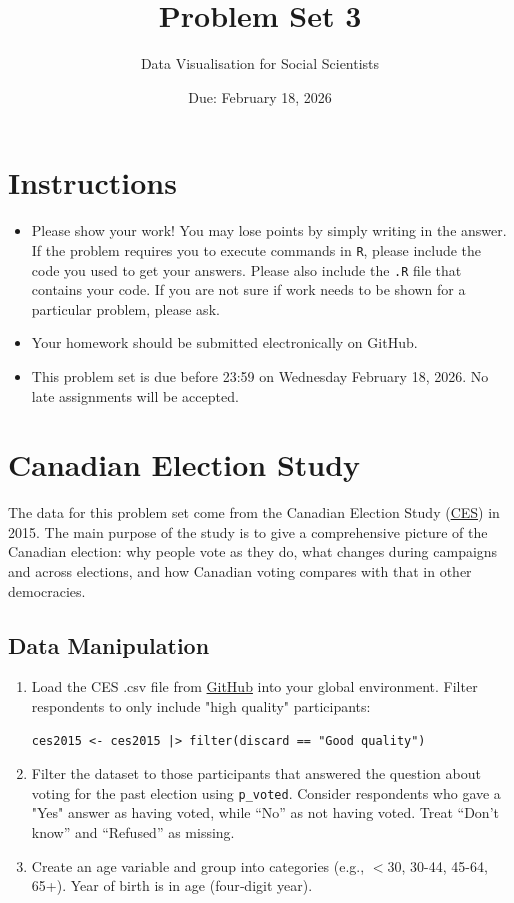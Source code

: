 \documentclass[12pt,letterpaper]{article}
\title{Problem Set 3}
\date{Due: February 18, 2026}
\author{Data Visualisation for Social Scientists}
\begin{document}
	\maketitle
	
	\section*{Instructions}
	\begin{itemize}
	\item Please show your work! You may lose points by simply writing in the answer. If the problem requires you to execute commands in \texttt{R}, please include the code you used to get your answers. Please also include the \texttt{.R} file that contains your code. If you are not sure if work needs to be shown for a particular problem, please ask.
\item Your homework should be submitted electronically on GitHub.
\item This problem set is due before 23:59 on Wednesday February 18, 2026. No late assignments will be accepted.
	\end{itemize}
	
	\vspace{.25cm}
	\section*{Canadian Election Study}
	
The data for this problem set come from the	Canadian Election Study (\href{https://ces-eec.sites.olt.ubc.ca/files/2017/04/CES2015_Combined_Data_Codebook.pdf}{CES})  in 2015. The main purpose of the study is to give a comprehensive picture of the Canadian election: why people vote as they do, what changes during campaigns and across elections, and how Canadian voting compares with that in other democracies.

\subsection*{Data Manipulation}
\begin{enumerate}
\item Load the CES .csv file from \href{https://raw.githubusercontent.com/ASDS-TCD/DataViz_2026/refs/heads/main/datasets/CES2015.csv}{GitHub} into your global environment. Filter respondents to only include "high quality" participants: 
\begin{verbatim}
ces2015 <- ces2015 |> filter(discard == "Good quality")
\end{verbatim}
\item Filter the dataset to those participants that answered the question about voting for the past election using \texttt{p\_voted}. Consider respondents who gave a "Yes" answer as having voted, while “No” as not having voted. Treat “Don’t know” and “Refused” as missing.
  
\item Create an age variable and group into categories (e.g., $<$30, 30-44, 45-64, 65+). Year of birth is in age (four‑digit year).
  
\end{enumerate}
\end{document}
